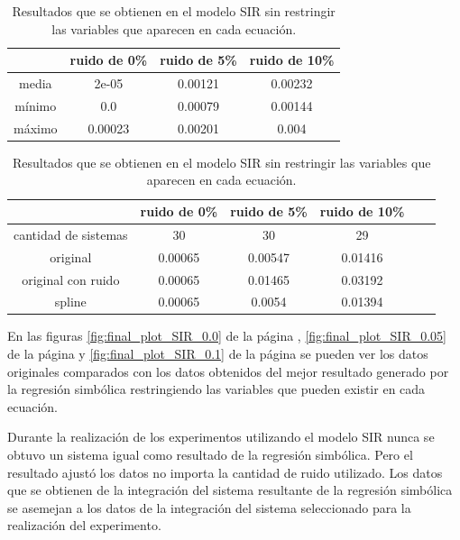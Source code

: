 \begin{table}[!h]
    \centering
    \caption{Resultados que se obtienen en el modelo SIR sin restringir las variables que aparecen en cada ecuación.}
    \begin{tabular}{|c|c|c|c|}
        \hline
               & \textbf{ruido de 0\%} & \textbf{ruido de 5\%} & \textbf{ruido de 10\%} \\
        \hline
        media  & 2e-05                 & 0.00121               & 0.00232                \\
        \hline
        mínimo & 0.0                   & 0.00079               & 0.00144                \\
        \hline
        máximo & 0.00023               & 0.00201               & 0.004                  \\
        \hline
    \end{tabular}

    \begin{tabular}{|c|c|c|c|c|c|}
        \hline
                             & \textbf{ruido de 0\%} & \textbf{ruido de 5\%} & \textbf{ruido de 10\%} \\
        \hline
        cantidad de sistemas & 30                    & 30                    & 29                     \\
        \hline
        original             & 0.00065               & 0.00547               & 0.01416                \\
        \hline
        original con ruido   & 0.00065               & 0.01465               & 0.03192                \\
        \hline
        spline               & 0.00065               & 0.0054                & 0.01394                \\
        \hline
    \end{tabular}
    \label{table:experiment_SIR_all}
\end{table}

En las figuras \ref{fig:final_plot_SIR_0.0} de la página \pageref{fig:final_plot_SIR_0.0}, \ref{fig:final_plot_SIR_0.05} de la página \pageref{fig:final_plot_SIR_0.05} y \ref{fig:final_plot_SIR_0.1} de la página \pageref{fig:final_plot_SIR_0.1} se pueden ver los datos originales comparados con los datos obtenidos del mejor resultado generado por la regresión simbólica restringiendo las variables que pueden existir en cada ecuación.

Durante la realización de los experimentos utilizando el modelo SIR nunca se obtuvo un sistema igual como resultado de la regresión simbólica. Pero el resultado ajustó los datos no importa la cantidad de ruido utilizado. Los datos que se obtienen de la integración del sistema resultante de la regresión simbólica se asemejan a los datos de la integración del sistema seleccionado para la realización del experimento.


